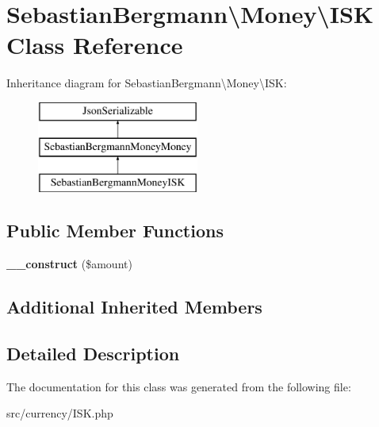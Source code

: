 \hypertarget{classSebastianBergmann_1_1Money_1_1ISK}{}\section{Sebastian\+Bergmann\textbackslash{}Money\textbackslash{}I\+S\+K Class Reference}
\label{classSebastianBergmann_1_1Money_1_1ISK}
Inheritance diagram for Sebastian\+Bergmann\textbackslash{}Money\textbackslash{}I\+S\+K\+:\begin{figure}[H]
\begin{center}
\leavevmode
\includegraphics[height=3.000000cm]{classSebastianBergmann_1_1Money_1_1ISK}
\end{center}
\end{figure}
\subsection*{Public Member Functions}
\begin{DoxyCompactItemize}
\item 
\hypertarget{classSebastianBergmann_1_1Money_1_1ISK_a605ddf887221bee73491ec254b3117d1}{}{\bfseries \+\_\+\+\_\+construct} (\$amount)\label{classSebastianBergmann_1_1Money_1_1ISK_a605ddf887221bee73491ec254b3117d1}

\end{DoxyCompactItemize}
\subsection*{Additional Inherited Members}


\subsection{Detailed Description}


The documentation for this class was generated from the following file\+:\begin{DoxyCompactItemize}
\item 
src/currency/I\+S\+K.\+php\end{DoxyCompactItemize}
